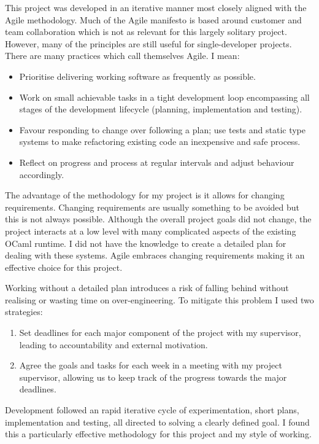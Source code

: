 This project was developed in an iterative manner most closely aligned with the Agile
methodology. Much of the Agile manifesto is based around customer and team collaboration which is
not as relevant for this largely solitary project. However, many of the principles are still useful
for single-developer projects. There are many practices which call themselves Agile. I mean:

\begin{itemize}
    \item Prioritise delivering working software as frequently as possible.
    \item Work on small achievable tasks in a tight development loop encompassing all stages of the
          development lifecycle (planning, implementation and testing).
    \item Favour responding to change over following a plan; use tests and static type systems to
          make refactoring existing code an inexpensive and safe process.
    \item Reflect on progress and process at regular intervals and adjust behaviour accordingly.
\end{itemize}

The advantage of the methodology for my project is it allows for changing requirements. Changing
requirements are  usually something to be avoided but this is not always possible.  Although the
overall project goals did not change, the project interacts at a low level with many complicated
aspects of the existing OCaml runtime. I did not have the knowledge to create a detailed plan for
dealing with these systems. Agile embraces changing requirements making it an effective choice for
this project.

Working without a detailed plan introduces a risk of falling behind without realising or wasting
time on over-engineering. To mitigate this problem I used two strategies:

\begin{enumerate}
    \item Set deadlines for each major component of the project with my supervisor, leading to
          accountability and external motivation.
    \item Agree the goals and tasks for each week in a meeting with my project supervisor,
          allowing us to keep track of the progress towards the major deadlines.
\end{enumerate}

Development followed an rapid iterative cycle of experimentation, short plans, implementation and
testing, all directed to solving a clearly defined goal. I found this a particularly effective
methodology for this project and my style of working.

